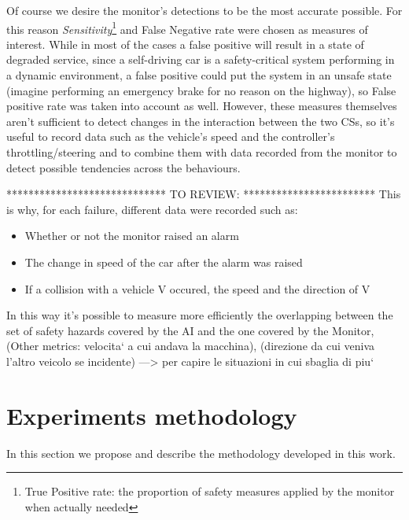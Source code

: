 Of course we desire the monitor's detections to be the most accurate possible. For this reason \textsl{Sensitivity}\footnote{True Positive rate: the proportion of safety measures applied by the monitor when actually needed} and False Negative rate were chosen as measures of interest.\newline
While in most of the cases a false positive will result in a state of degraded service, since a self-driving car is a safety-critical system performing in a dynamic environment, a false positive could put the system in an unsafe state (imagine performing an emergency brake for no reason on the highway), so False positive rate was taken into account as well.\newline
However, these measures themselves aren't sufficient to detect changes in the interaction between the two CSs, so it's useful to record data such as the vehicle's speed and the controller's throttling/steering and to combine them with data recorded from the monitor to detect possible tendencies across the behaviours.

*****************************\newline 
TO REVIEW: 
\newline *************************\newline
This is why, for each failure, different data were recorded such as:
\begin{itemize}
	\item Whether or not the monitor raised an alarm
	\item The change in speed of the car after the alarm was raised
	\item If a collision with a vehicle V occured, the speed and the direction of V
\end{itemize}

In this way it's possible to measure more efficiently the overlapping between the set of safety hazards covered by the AI and the one covered by the Monitor,
(Other metrics: velocita` a cui andava la macchina), (direzione da cui veniva l'altro veicolo se incidente)
---> per capire le situazioni in cui sbaglia di piu`


\section{Experiments methodology}

In this section we propose and describe the methodology developed in this work.\newline

